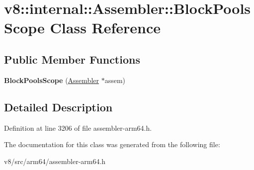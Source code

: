 \hypertarget{classv8_1_1internal_1_1Assembler_1_1BlockPoolsScope}{}\section{v8\+:\+:internal\+:\+:Assembler\+:\+:Block\+Pools\+Scope Class Reference}
\label{classv8_1_1internal_1_1Assembler_1_1BlockPoolsScope}
\subsection*{Public Member Functions}
\begin{DoxyCompactItemize}
\item 
\mbox{\label{classv8_1_1internal_1_1Assembler_1_1BlockPoolsScope_a85f2cd5f7ee9aa1bc76fbf3e713c2f45}} 
{\bfseries Block\+Pools\+Scope} (\mbox{\hyperlink{classv8_1_1internal_1_1Assembler}{Assembler}} $\ast$assem)
\end{DoxyCompactItemize}


\subsection{Detailed Description}


Definition at line 3206 of file assembler-\/arm64.\+h.



The documentation for this class was generated from the following file\+:\begin{DoxyCompactItemize}
\item 
v8/src/arm64/assembler-\/arm64.\+h\end{DoxyCompactItemize}
